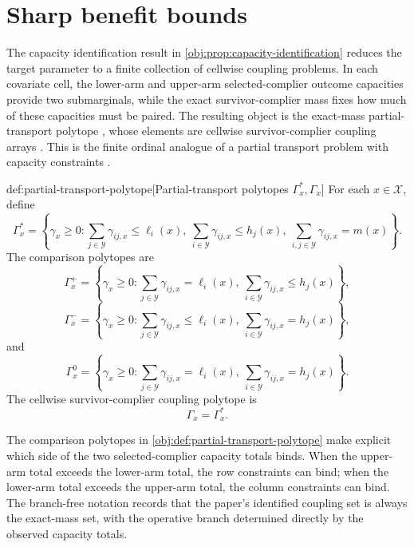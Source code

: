 \documentclass[11pt]{article}
\begin{document}
\section{Sharp benefit bounds}\label{sec:sharp-bounds}

The capacity identification result in \cref{obj:prop:capacity-identification} reduces the target parameter to a finite collection of cellwise coupling problems. In each covariate cell, the lower-arm and upper-arm selected-complier outcome capacities provide two submarginals, while the exact survivor-complier mass fixes how much of these capacities must be paired. The resulting object is the exact-mass partial-transport polytope , whose elements are cellwise survivor-complier coupling arrays . This is the finite ordinal analogue of a partial transport problem with capacity constraints \citep{Villani2009}.

\begin{definitionv}{def:partial-transport-polytope}[Partial-transport polytopes \(\Gamma_x^\ast,\Gamma_x\)]
For each \(x\in\mathcal X\), define
\[
\Gamma_x^{\ast}
=
\left\{
\gamma_x\ge0:
\sum_{j\in\mathcal Y}\gamma_{ij,x}\le\ell_i(x),\
\sum_{i\in\mathcal Y}\gamma_{ij,x}\le h_j(x),\
\sum_{i,j\in\mathcal Y}\gamma_{ij,x}=m(x)
\right\}.
\]
The comparison polytopes are
\[
\Gamma_x^{+}
=
\left\{
\gamma_x\ge0:
\sum_{j\in\mathcal Y}\gamma_{ij,x}=\ell_i(x),\
\sum_{i\in\mathcal Y}\gamma_{ij,x}\le h_j(x)
\right\},
\]
\[
\Gamma_x^{-}
=
\left\{
\gamma_x\ge0:
\sum_{j\in\mathcal Y}\gamma_{ij,x}\le\ell_i(x),\
\sum_{i\in\mathcal Y}\gamma_{ij,x}=h_j(x)
\right\},
\]
and
\[
\Gamma_x^{0}
=
\left\{
\gamma_x\ge0:
\sum_{j\in\mathcal Y}\gamma_{ij,x}=\ell_i(x),\
\sum_{i\in\mathcal Y}\gamma_{ij,x}=h_j(x)
\right\}.
\]
The cellwise survivor-complier coupling polytope is
\[
\Gamma_x=\Gamma_x^{\ast}.
\]
\end{definitionv}

The comparison polytopes in \cref{obj:def:partial-transport-polytope} make explicit which side of the two selected-complier capacity totals binds. When the upper-arm total exceeds the lower-arm total, the row constraints can bind; when the lower-arm total exceeds the upper-arm total, the column constraints can bind. The branch-free notation  records that the paper's identified coupling set is always the exact-mass set, with the operative branch determined directly by the observed capacity totals.
\end{document}
